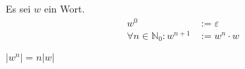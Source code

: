 \begin{definition}
  Es sei $w$ ein Wort.
  \begin{align*}
    w^0 &:= \varepsilon \\
    \forall n \in \mathbb{N}_0: w^{n+1} &:= w^n \cdot w
  \end{align*}
\end{definition}
\begin{lemma}
  $|w^n| = n|w|$
\end{lemma}